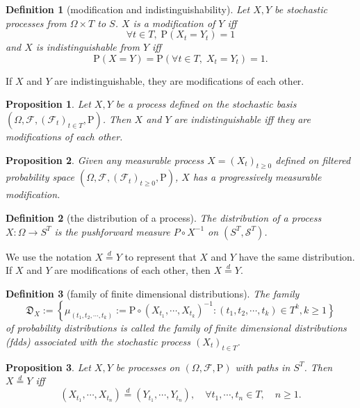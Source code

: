 \documentclass{report}
\newtheorem{definition}{Definition}[section]
\newtheorem{proposition}{Proposition}[section]
\theoremstyle{nonumberplain}
\begin{document}
\begin{definition}[modification and indistinguishability]
	Let $X, Y$ be stochastic processes from $\Omega\times T$ to $S$.
	$X$ is a \emph{modification} of $Y$ iff
	\[
	\forall t \in T,\; \mathrm{P}(X_t=Y_t)=1
	\]
	and $X$ is \emph{indistinguishable} from $Y$ iff
	\[
	\mathrm{P}(X=Y)=\mathrm{P}(\forall t \in T,\; X_t=Y_t)=1.
	\]
\end{definition}
If $X$ and $Y$ are indistinguishable, they are modifications of each other.
\begin{proposition}
	Let $X,Y$ be a process defined on the stochastic basis $(\Omega,\mathcal{F},(\mathcal{F}_{t})_{t\in T },\mathrm{P})$. Then $X$ and $Y$ are indistinguishable iff
	they are modifications of each other.
\end{proposition}

\begin{proposition}
	Given any measurable process $X=(X_t)_{t\ge0}$ defined on filtered probability space $(\Omega,\mathcal{F},(\mathcal{F}_{t})_{t\ge0},\mathrm{P})$, $X$ has a progressively measurable modification.
\end{proposition}



\begin{definition}[the distribution of a process]
	The distribution of a process $X: \Omega \rightarrow S^T$ is the pushforward measure $P\circ X^{-1}$ on $(S^T,\mathcal{S}^T)$.
\end{definition}
We use the notation $X \stackrel{d}{=} Y$ to represent that $X$ and $Y$ have the same distribution. If $X$ and $Y$ are modifications of each other, then $X \stackrel{d}{=} Y$.

\begin{definition}[family of finite dimensional distributions]
	The family 
	$$\mathfrak{D}_X:=\left\{\mu_{(t_{1}, t_{2}, \cdots, t_{k})}:= \mathrm{P}\circ\left(X_{t_{1}}, \cdots, X_{t_{k}}\right)^{-1}:\right.\left.\left(t_{1}, t_{2}, \cdots, t_{k}\right) \in T^k,k\ge1\right\}$$ of probability distributions is called	the \emph{family of finite dimensional distributions (fdds) associated with the stochastic process $(X_{t})_{t\in T}$}.
\end{definition}

\begin{proposition}
	Let $X,Y$ be processes on $(\Omega ,{\mathcal{F}},\mathrm{P})$ with paths in $S^T$. Then $X \stackrel{d}{=} Y$ iff
	\[
	\left(X_{t_{1}}, \cdots, X_{t_{n}}\right) \stackrel{d}{=}\left(Y_{t_{1}}, \cdots, Y_{t_{n}}\right), \quad \forall t_{1}, \cdots, t_{n} \in T,\quad n\ge 1.
	\]
\end{proposition}
\end{document}
